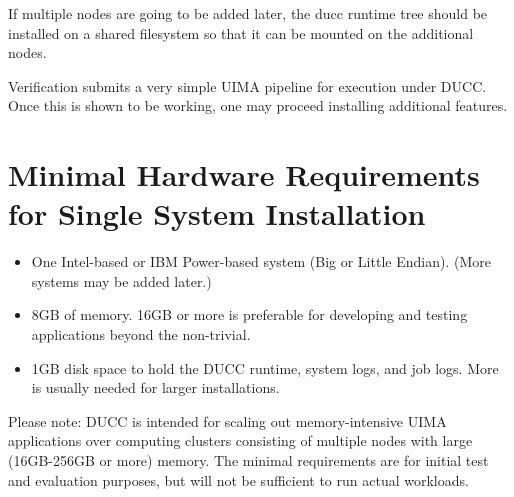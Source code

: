 If multiple nodes are going to be added later, the ducc runtime tree should be installed
on a shared filesystem so that it can be mounted on the additional nodes.

Verification submits a very simple UIMA pipeline for execution under DUCC.  Once this is shown to be
working, one may proceed installing additional features.


\section{Minimal Hardware Requirements for Single System Installation}
\begin{itemize}
    \item One Intel-based or IBM Power-based system (Big or Little Endian).  (More systems may be added later.)

    \item 8GB of memory.  16GB or more is preferable for developing and testing applications beyond
      the non-trivial.  

    \item 1GB disk space to hold the DUCC runtime, system logs, and job logs.  More is
      usually needed for larger installations.  
\end{itemize}

Please note: DUCC is intended for scaling out memory-intensive UIMA applications over computing
clusters consisting of multiple nodes with large (16GB-256GB or more) memory.  The minimal
requirements are for initial test and evaluation purposes, but will not be sufficient to run actual
workloads.

